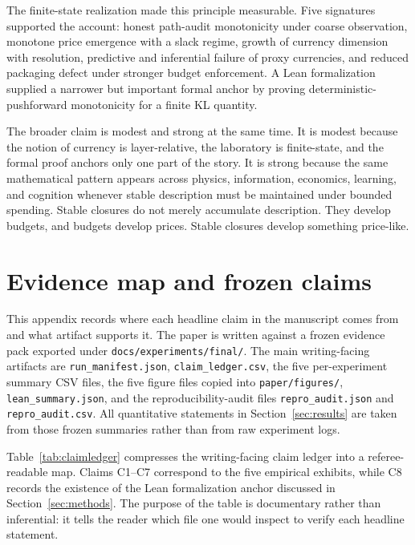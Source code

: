 \documentclass[11pt,a4paper]{article}
\DeclareRobustCommand{\code}[1]{{\begingroup\urlstyle{tt}\nolinkurl{#1}\endgroup}}
\begin{document}
The finite-state realization made this principle measurable. Five signatures supported the account: honest path-audit monotonicity under coarse observation, monotone price emergence with a slack regime, growth of currency dimension with resolution, predictive and inferential failure of proxy currencies, and reduced packaging defect under stronger budget enforcement. A Lean formalization supplied a narrower but important formal anchor by proving deterministic-pushforward monotonicity for a finite KL quantity.

The broader claim is modest and strong at the same time. It is modest because the notion of currency is layer-relative, the laboratory is finite-state, and the formal proof anchors only one part of the story. It is strong because the same mathematical pattern appears across physics, information, economics, learning, and cognition whenever stable description must be maintained under bounded spending. Stable closures do not merely accumulate description. They develop budgets, and budgets develop prices. Stable closures develop something price-like.
 
\appendix
\section{Evidence map and frozen claims}\label{app:evidence}

This appendix records where each headline claim in the manuscript comes from and what artifact supports it. The paper is written against a frozen evidence pack exported under \code{docs/experiments/final/}. The main writing-facing artifacts are \code{run_manifest.json}, \code{claim_ledger.csv}, the five per-experiment summary CSV files, the five figure files copied into \code{paper/figures/}, \code{lean_summary.json}, and the reproducibility-audit files \code{repro_audit.json} and \code{repro_audit.csv}. All quantitative statements in Section~\ref{sec:results} are taken from those frozen summaries rather than from raw experiment logs.

Table~\ref{tab:claimledger} compresses the writing-facing claim ledger into a referee-readable map. Claims C1--C7 correspond to the five empirical exhibits, while C8 records the existence of the Lean formalization anchor discussed in Section~\ref{sec:methods}. The purpose of the table is documentary rather than inferential: it tells the reader which file one would inspect to verify each headline statement.
\end{document}
